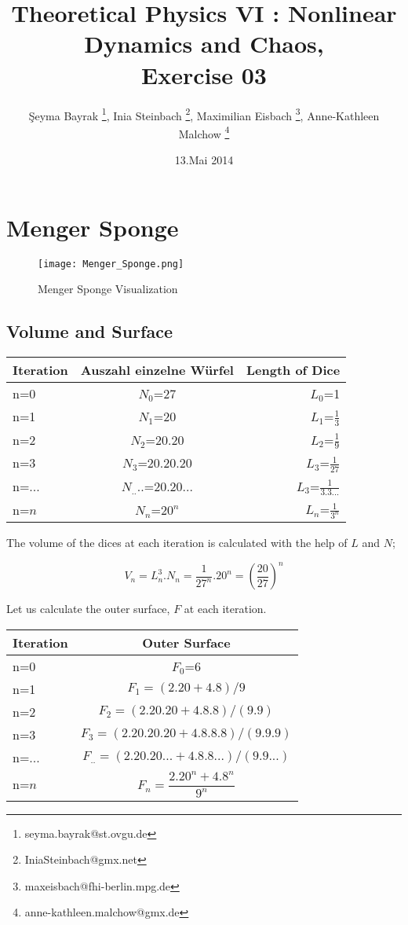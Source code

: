 \documentclass[12pt]{article}
\title{Theoretical Physics VI :  Nonlinear Dynamics and Chaos, \\ Exercise 03}
\author{\c{S}eyma Bayrak \thanks{seyma.bayrak@st.ovgu.de}, Inia Steinbach \thanks{IniaSteinbach@gmx.net}, Maximilian Eisbach \thanks{maxeisbach@fhi-berlin.mpg.de}, Anne-Kathleen Malchow \thanks{anne-kathleen.malchow@gmx.de}}
\date{13.Mai 2014}
\begin{document}
   \maketitle

\section{Menger Sponge}
   
\begin{figure}[h!]
	\centering
	\texttt{[image: Menger\_Sponge.png]}
		\caption{Menger Sponge Visualization}
\end{figure}   
   
\subsection{Volume and Surface }   

\begin{center}
  \begin{tabular}{ l | c | r }
    
    Iteration & Auszahl einzelne Würfel & Length of Dice \\ \hline
    n=0 & $N_0$=27 & $L_0$=1 \\ \hline
    n=1 & $N_1$=20 & $L_1$=$\frac{1}{3}$ \\ \hline
    n=2 & $N_2$=20.20 & $L_2$=$\frac{1}{9}$ \\ \hline
    n=3 & $N_3$=20.20.20 & $L_3$=$\frac{1}{27}$ \\ \hline
     n=... & $N_{..}..$=20.20... & $L_3$=$\frac{1}{3.3...}$ \\ \hline
    n=$n$ & $N_n$=$20^n$ & $L_n$=$\frac{1}{3^n}$ \\ 
     \end{tabular}
\end{center}

\newpage

The volume of the dices at each iteration is calculated with the help of $L$ and $N$;

\begin{equation*}
V_n = L_n^3 . N_n = \frac{1}{27^n}.20^n = (\frac{20}{27})^n
\end{equation*}

Let us calculate the outer surface, $F$ at each iteration.
\begin{center}
  \begin{tabular}{ l | c  }
    
    Iteration & Outer Surface \\ \hline
    n=0 & $F_0$=6  \\ \hline
    n=1 & $F_1 = (2.20 + 4.8) / 9$  \\ \hline
    n=2 & $F_2 = (2.20.20 + 4.8.8) / (9.9)$ \\ \hline
    n=3 & $F_3 = (2.20.20.20 + 4.8.8.8) / (9.9.9)$ \\ \hline
    n=... & $F_{..} = (2.20.20... + 4.8.8...) / (9.9...)$ \\ 
    n=$n$ & $F_n = \dfrac{2.20^n+4.8^n}{9^n}$ \\ 
     \end{tabular}
\end{center}
\end{document}
